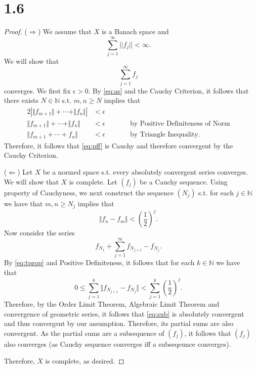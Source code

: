 \documentclass[10pt]{article}
\begin{document}
\section*{1.6}

\begin{proof}
    ($\Rightarrow$) We assume that $X$ is a Banach space and
    \begin{equation}\label{eq:as}
        \sum_{j=1}^\infty ||f_j||<\infty.
    \end{equation} 
    We will show that
    \begin{equation} \label{eq:pff}
        \sum_{j=1}^\infty f_j 
    \end{equation}
    converges. We first fix $\epsilon > 0.$ By \eqref{eq:as} and the Cauchy Criterion, it follows that there exists $N\in\mathbb{N}$ s.t. $m,n\ge N$ implies that
    \begin{alignat*}{2}
       | \Vert f_{m+1}\Vert + \cdots + \Vert f_n\Vert |&< \epsilon\\
       \Vert f_{m+1}\Vert  + \cdots + \Vert f_n\Vert  &<\epsilon \qquad&& \text{by Positive Definiteness of Norm}\\
       \Vert f_{m+1} + \cdots + f_n \Vert  &< \epsilon && \text{by Triangle Inequality}.
    \end{alignat*}
    Therefore, it follows that \eqref{eq:pff} is Cauchy and therefore convergent by the Cauchy Criterion.

    ($\Leftarrow$) Let $X$ be a normed space s.t. every absolutely convergent series converges. We will show that $X$ is complete. 
    Let $(f_j)$ be a Cauchy sequence. Using property of Cauchyness, we next construct the sequence $(N_j)$ s.t. for each $j\in\mathbb{N}$ we have that $m,n \ge N_j$ implies that
    \begin{equation} \label{eq:tprop}
        \Vert f_n-f_m\Vert  < \left(\frac{1}{2}\right)^j.
    \end{equation}
    Now consider the series
    \begin{equation} \label{eq:sub}
        f_{N_1} + \sum_{j=1}^{\infty}f_{N_{j+1}} - f_{N_{j}}.
    \end{equation}
    By \eqref{eq:tprop} and Positive Definiteness, it follows that for each $k \in \mathbb{N}$ we have that
    \[0 \le \sum_{j=1}^{k}\Vert f_{N_{j+1}} - f_{N_{j}}\Vert  < \sum_{j=1}^k \left( \frac{1}{2}\right )^j.\]
    Therefore, by the Order Limit Theorem, Algebraic Limit Theorem and convergence of geometric series, it follows that \eqref{eq:sub} is absolutely convergent and thus convergent by our assumption. Therefore, its partial sums are also convergent. As the partial sums are a subsequence of $(f_j)$, it follows that $(f_j)$ also converges (as Cauchy sequence converges iff a subseqeunce converges).

    Therefore, $X$ is complete, as desired.
\end{proof}
\end{document}
